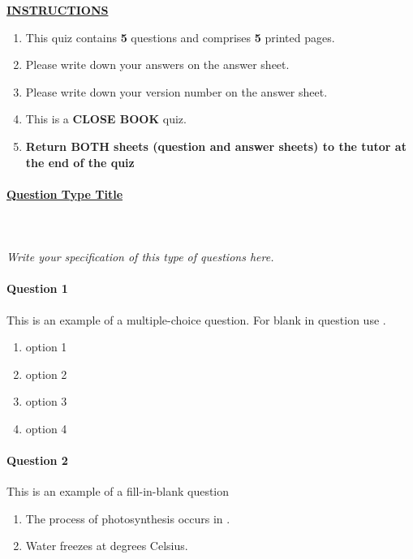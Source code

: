 \documentclass[a4paper,12pt,fleqn]{article}
\begin{document}
\noindent\underline{\bf INSTRUCTIONS}
\vspace{0.25cm}


\begin{enumerate}
\item This quiz contains {\bf 5} questions and comprises 
{\bf 5} printed pages.
\item Please write down your answers on the answer sheet. 
\item Please write down your version number on the answer sheet.
\item This is a {\bf CLOSE BOOK} quiz.
\item {\bf Return BOTH sheets (question and answer sheets) to the tutor at the end of the quiz}
\end{enumerate}



\newpage
\paragraph{\textbf{\underline{Question Type Title}}}

~\\~\\ \textit{Write your specification of this type of questions here.}

\bigskip
\paragraph{\textbf{Question 1}}
This is an example of a multiple-choice question. For blank in question use \underline{\hspace{2cm}}.  
\begin{enumerate}[label=\alph*.]
    \item option 1
    \item option 2
    \item option 3
    \item option 4
\end{enumerate}

\newpage
\paragraph{\textbf{Question 2}}
This is an example of a fill-in-blank question
\begin{enumerate}
    \item The process of photosynthesis occurs in \underline{\hspace{5cm}}.
    \item Water freezes at \underline{\hspace{2cm}} degrees Celsius.
\end{enumerate}
\end{document}
